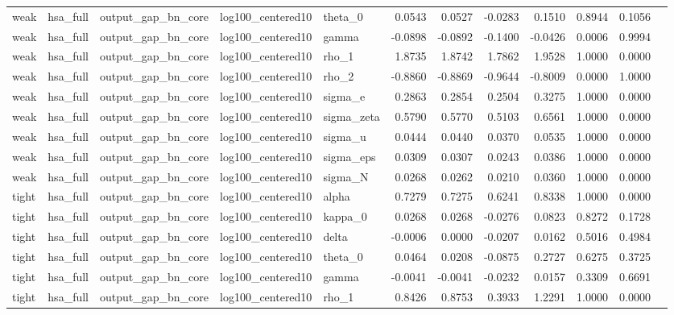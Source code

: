 \begin{tabular}{lllllrrrrrrl}
weak & hsa\_full & output\_gap\_bn\_core & log100\_centered10 & theta\_0 & 0.0543 & 0.0527 & -0.0283 & 0.1510 & 0.8944 & 0.1056 &  \\
weak & hsa\_full & output\_gap\_bn\_core & log100\_centered10 & gamma & -0.0898 & -0.0892 & -0.1400 & -0.0426 & 0.0006 & 0.9994 &  \\
weak & hsa\_full & output\_gap\_bn\_core & log100\_centered10 & rho\_1 & 1.8735 & 1.8742 & 1.7862 & 1.9528 & 1.0000 & 0.0000 &  \\
weak & hsa\_full & output\_gap\_bn\_core & log100\_centered10 & rho\_2 & -0.8860 & -0.8869 & -0.9644 & -0.8009 & 0.0000 & 1.0000 &  \\
weak & hsa\_full & output\_gap\_bn\_core & log100\_centered10 & sigma\_e & 0.2863 & 0.2854 & 0.2504 & 0.3275 & 1.0000 & 0.0000 &  \\
weak & hsa\_full & output\_gap\_bn\_core & log100\_centered10 & sigma\_zeta & 0.5790 & 0.5770 & 0.5103 & 0.6561 & 1.0000 & 0.0000 &  \\
weak & hsa\_full & output\_gap\_bn\_core & log100\_centered10 & sigma\_u & 0.0444 & 0.0440 & 0.0370 & 0.0535 & 1.0000 & 0.0000 &  \\
weak & hsa\_full & output\_gap\_bn\_core & log100\_centered10 & sigma\_eps & 0.0309 & 0.0307 & 0.0243 & 0.0386 & 1.0000 & 0.0000 &  \\
weak & hsa\_full & output\_gap\_bn\_core & log100\_centered10 & sigma\_N & 0.0268 & 0.0262 & 0.0210 & 0.0360 & 1.0000 & 0.0000 &  \\
tight & hsa\_full & output\_gap\_bn\_core & log100\_centered10 & alpha & 0.7279 & 0.7275 & 0.6241 & 0.8338 & 1.0000 & 0.0000 &  \\
tight & hsa\_full & output\_gap\_bn\_core & log100\_centered10 & kappa\_0 & 0.0268 & 0.0268 & -0.0276 & 0.0823 & 0.8272 & 0.1728 &  \\
tight & hsa\_full & output\_gap\_bn\_core & log100\_centered10 & delta & -0.0006 & 0.0000 & -0.0207 & 0.0162 & 0.5016 & 0.4984 &  \\
tight & hsa\_full & output\_gap\_bn\_core & log100\_centered10 & theta\_0 & 0.0464 & 0.0208 & -0.0875 & 0.2727 & 0.6275 & 0.3725 &  \\
tight & hsa\_full & output\_gap\_bn\_core & log100\_centered10 & gamma & -0.0041 & -0.0041 & -0.0232 & 0.0157 & 0.3309 & 0.6691 &  \\
tight & hsa\_full & output\_gap\_bn\_core & log100\_centered10 & rho\_1 & 0.8426 & 0.8753 & 0.3933 & 1.2291 & 1.0000 & 0.0000 &  \\

\end{tabular}

